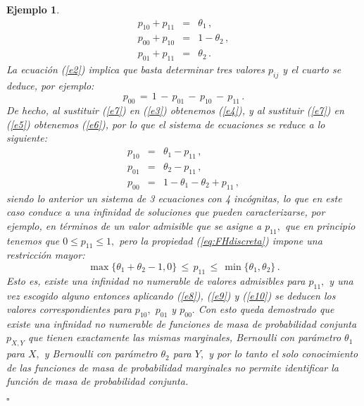 \documentclass[spanish,10pt,letterpaper]{article}
\newtheorem{ejem}{Ejemplo}
\newcommand{\qed}{\begin{flushright}$\square$\end{flushright}}
\begin{document}
\begin{ejem}
\begin{eqnarray}
       p_{10} + p_{11} &=& \theta_1\,,\label{e4}\\
       p_{00} + p_{10} &=& 1 - \theta_2\,,\label{e5} \\
       p_{01} + p_{11} &=& \theta_2\,.\label{e6}
   \end{eqnarray}
   La ecuación (\ref{e2}) implica que basta determinar tres valores $p_{ij}$ y el cuarto se deduce, por ejemplo:
\begin{equation}\label{e7}
    p_{00} \,=\, 1 \,-\, p_{01} \,-\, p_{10} \,-\, p_{11}\,.
\end{equation}
De hecho, al sustituir (\ref{e7}) en (\ref{e3}) obtenemos (\ref{e4}), y al sustituir (\ref{e7}) en (\ref{e5}) obtenemos (\ref{e6}), por lo que el sistema de ecuaciones se reduce a lo siguiente:
\begin{eqnarray}
    p_{10} &=& \theta_1 - p_{11}\,, \label{e8} \\ 
    p_{01} &=& \theta_2 - p_{11}\,, \label{e9} \\ 
    p_{00} &=& 1 - \theta_1-\theta_2+p_{11}\,, \label{e10} 
\end{eqnarray}
siendo lo anterior un sistema de 3 ecuaciones con 4 incógnitas, lo que en este caso conduce a una infinidad de soluciones que pueden caracterizarse, por ejemplo, en términos de un valor admisible que se asigne a $p_{11},$ que en principio tenemos que $0\leq p_{11}\leq 1,$ pero la propiedad (\ref{eq:FHdiscreta}) impone una restricción mayor:
\begin{equation}\label{e11}
    \max\{\theta_1+\theta_2-1,0\} \,\leq\, p_{11} \,\leq\, \min\{\theta_1,\theta_2\}\,.
\end{equation}
Esto es, existe una infinidad no numerable de valores admisibles para $p_{11},$ y una vez escogido alguno entonces aplicando (\ref{e8}), (\ref{e9}) y (\ref{e10}) se deducen los valores correspondientes para $p_{10},$ $p_{01}$ y $p_{00}.$ Con esto queda demostrado que existe una infinidad no numerable de funciones de masa de probabilidad conjunta $p_{X,Y}$ que tienen exactamente las mismas marginales, Bernoulli con parámetro $\theta_1$ para $X,$ y Bernoulli con parámetro $\theta_2$ para $Y,$ y por lo tanto el solo conocimiento de las funciones de masa de probabilidad marginales no permite identificar la función de masa de probabilidad conjunta.  \qed 
\end{ejem}
\end{document}
